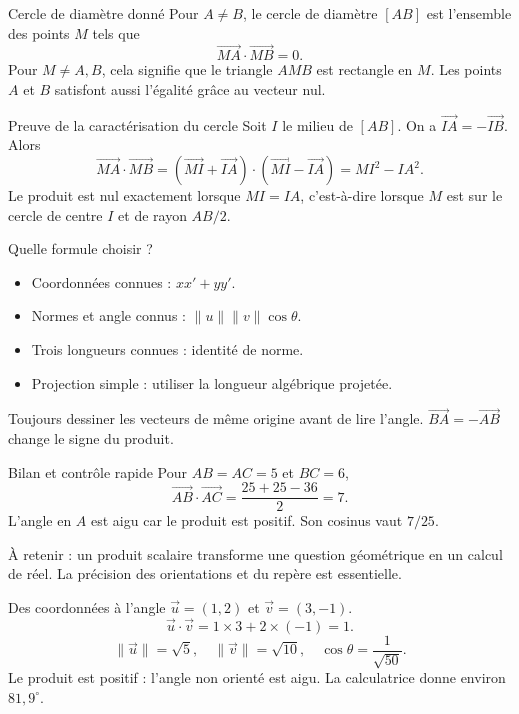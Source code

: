 \documentclass[aspectratio=169,12pt]{beamer}
\begin{document}
\renewcommand{\slidekind}{COMPRENDRE}
\begin{frame}[t,fragile]{Cercle de diamètre donné}
Pour $A\ne B$, le cercle de diamètre $[AB]$ est l’ensemble des points $M$ tels que\[\overrightarrow{MA}\cdot\overrightarrow{MB}=0.\]Pour $M\ne A,B$, cela signifie que le triangle $AMB$ est rectangle en $M$. Les points $A$ et $B$ satisfont aussi l’égalité grâce au vecteur nul.
\end{frame}
\renewcommand{\slidekind}{JUSTIFIER}
\begin{frame}[t,fragile]{Preuve de la caractérisation du cercle}
Soit $I$ le milieu de $[AB]$. On a $\overrightarrow{IA}=-\overrightarrow{IB}$. Alors\[\overrightarrow{MA}\cdot\overrightarrow{MB}=(\overrightarrow{MI}+\overrightarrow{IA})\cdot(\overrightarrow{MI}-\overrightarrow{IA})=MI^2-IA^2.\]Le produit est nul exactement lorsque $MI=IA$, c’est-à-dire lorsque $M$ est sur le cercle de centre $I$ et de rayon $AB/2$.
\end{frame}
\renewcommand{\slidekind}{MÉTHODE \& EXEMPLE}
\begin{frame}[t,fragile]{Quelle formule choisir ?}
\begin{itemize}\item Coordonnées connues : $xx\prime+yy\prime$.\item Normes et angle connus : $\|u\|\|v\|\cos\theta$.\item Trois longueurs connues : identité de norme.\item Projection simple : utiliser la longueur algébrique projetée.\end{itemize}Toujours dessiner les vecteurs de même origine avant de lire l’angle. $\overrightarrow{BA}=-\overrightarrow{AB}$ change le signe du produit.
\end{frame}
\renewcommand{\slidekind}{À RETENIR}
\begin{frame}[t,fragile]{Bilan et contrôle rapide}
Pour $AB=AC=5$ et $BC=6$,\[\overrightarrow{AB}\cdot\overrightarrow{AC}=\frac{25+25-36}{2}=7.\]L’angle en $A$ est aigu car le produit est positif. Son cosinus vaut $7/25$.\medskip\par À retenir : un produit scalaire transforme une question géométrique en un calcul de réel. La précision des orientations et du repère est essentielle.
\end{frame}
\renewcommand{\slidekind}{COMPRENDRE}
\begin{frame}[t,fragile]{Des coordonnées à l’angle}
$\vec u=(1,2)$ et $\vec v=(3,-1)$.\[\vec u\cdot\vec v=1\times3+2\times(-1)=1.\]\[\|\vec u\|=\sqrt5,\quad\|\vec v\|=\sqrt{10},\quad\cos\theta=\frac1{\sqrt{50}}.\] Le produit est positif : l’angle non orienté est aigu. La calculatrice donne environ $81,9^\circ$.
\end{frame}
\end{document}
